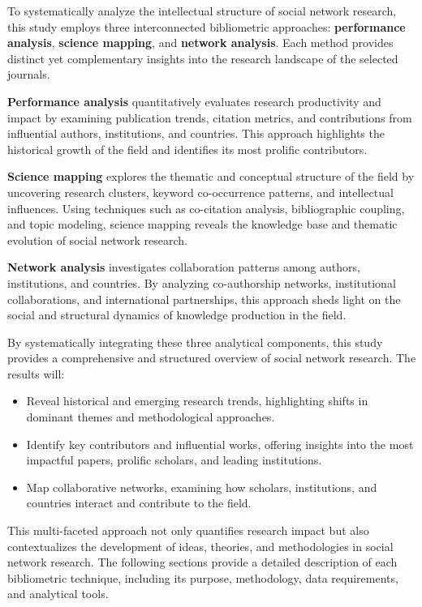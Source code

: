 \documentclass[twocolumn]{article}
\begin{document}
	To systematically analyze the intellectual structure of social network research, this study employs three interconnected bibliometric approaches: \textbf{performance analysis}, \textbf{science mapping}, and \textbf{network analysis}. Each method provides distinct yet complementary insights into the research landscape of the selected journals.
	
	\textbf{Performance analysis} quantitatively evaluates research productivity and impact by examining publication trends, citation metrics, and contributions from influential authors, institutions, and countries. This approach highlights the historical growth of the field and identifies its most prolific contributors.
	
	\textbf{Science mapping} explores the thematic and conceptual structure of the field by uncovering research clusters, keyword co-occurrence patterns, and intellectual influences. Using techniques such as co-citation analysis, bibliographic coupling, and topic modeling, science mapping reveals the knowledge base and thematic evolution of social network research.
	
	\textbf{Network analysis} investigates collaboration patterns among authors, institutions, and countries. By analyzing co-authorship networks, institutional collaborations, and international partnerships, this approach sheds light on the social and structural dynamics of knowledge production in the field.
	
	By systematically integrating these three analytical components, this study provides a comprehensive and structured overview of social network research. The results will:
	\begin{itemize}
		\item Reveal historical and emerging research trends, highlighting shifts in dominant themes and methodological approaches.
		\item Identify key contributors and influential works, offering insights into the most impactful papers, prolific scholars, and leading institutions.
		\item Map collaborative networks, examining how scholars, institutions, and countries interact and contribute to the field.
	\end{itemize}
	
	This multi-faceted approach not only quantifies research impact but also contextualizes the development of ideas, theories, and methodologies in social network research. The following sections provide a detailed description of each bibliometric technique, including its purpose, methodology, data requirements, and analytical tools.
	
\end{document}
